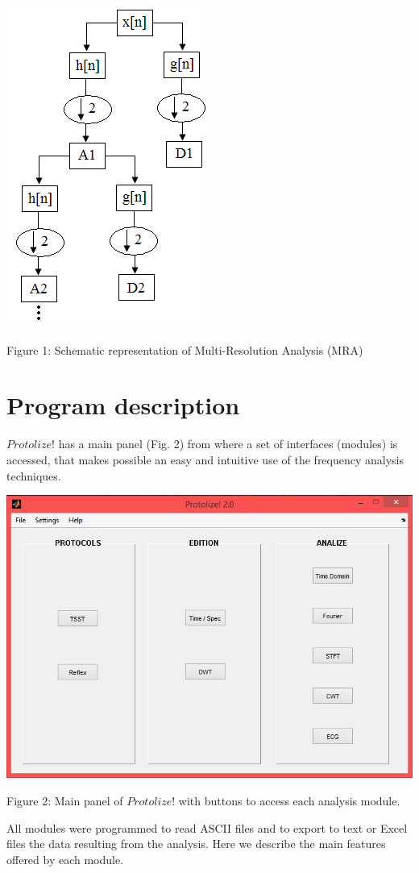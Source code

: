 \documentclass[12pt, a4paper]{article}
\begin{document}
\begin{center}
\includegraphics{image001.png}

Figure 1: Schematic representation of Multi-Resolution Analysis (MRA) 
\end{center}


\section{Program description}

$Protolize!$ has a main panel (Fig. 2) from where a set of interfaces (modules) is accessed, that makes possible an easy and intuitive use of the frequency analysis techniques. 
\begin{center}
\includegraphics[width=15cm]{image002.jpg}

Figure 2: Main panel of $Protolize!$ with buttons to access each analysis module.
\end{center}
All modules were programmed to read ASCII files and to export to text or Excel files the data resulting from the analysis. Here we describe the main features offered by each module. 
\end{document}

